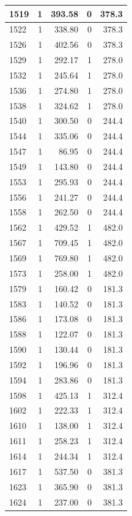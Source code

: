 \documentclass[
  12pt,
]{book}
\begin{document}
\begin{tabular}{l|r|r|r|r}
\hline
1519 & 1 & 393.58 & 0 & 378.3\\
\hline
1522 & 1 & 338.80 & 0 & 378.3\\
\hline
1526 & 1 & 402.56 & 0 & 378.3\\
\hline
1529 & 1 & 292.17 & 1 & 278.0\\
\hline
1532 & 1 & 245.64 & 1 & 278.0\\
\hline
1536 & 1 & 274.80 & 1 & 278.0\\
\hline
1538 & 1 & 324.62 & 1 & 278.0\\
\hline
1540 & 1 & 300.50 & 0 & 244.4\\
\hline
1544 & 1 & 335.06 & 0 & 244.4\\
\hline
1547 & 1 & 86.95 & 0 & 244.4\\
\hline
1549 & 1 & 143.80 & 0 & 244.4\\
\hline
1553 & 1 & 295.93 & 0 & 244.4\\
\hline
1556 & 1 & 241.27 & 0 & 244.4\\
\hline
1558 & 1 & 262.50 & 0 & 244.4\\
\hline
1562 & 1 & 429.52 & 1 & 482.0\\
\hline
1567 & 1 & 709.45 & 1 & 482.0\\
\hline
1569 & 1 & 769.80 & 1 & 482.0\\
\hline
1573 & 1 & 258.00 & 1 & 482.0\\
\hline
1579 & 1 & 160.42 & 0 & 181.3\\
\hline
1583 & 1 & 140.52 & 0 & 181.3\\
\hline
1586 & 1 & 173.08 & 0 & 181.3\\
\hline
1588 & 1 & 122.07 & 0 & 181.3\\
\hline
1590 & 1 & 130.44 & 0 & 181.3\\
\hline
1592 & 1 & 196.96 & 0 & 181.3\\
\hline
1594 & 1 & 283.86 & 0 & 181.3\\
\hline
1598 & 1 & 425.13 & 1 & 312.4\\
\hline
1602 & 1 & 222.33 & 1 & 312.4\\
\hline
1610 & 1 & 138.00 & 1 & 312.4\\
\hline
1611 & 1 & 258.23 & 1 & 312.4\\
\hline
1614 & 1 & 244.34 & 1 & 312.4\\
\hline
1617 & 1 & 537.50 & 0 & 381.3\\
\hline
1623 & 1 & 365.90 & 0 & 381.3\\
\hline
1624 & 1 & 237.00 & 0 & 381.3\\

\end{tabular}
\end{document}
